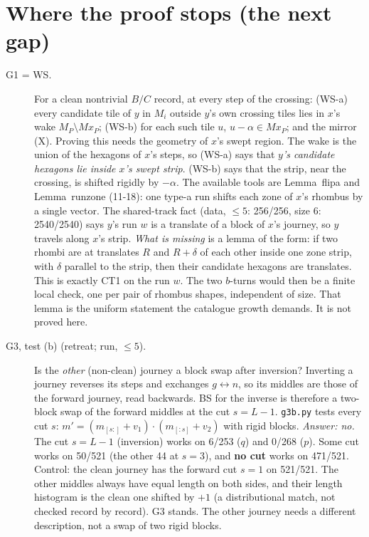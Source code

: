 \documentclass[11pt]{article}
\theoremstyle{definition}\newtheorem{definition}[theorem]{Definition}\newtheorem{remark}[theorem]{Remark}
\begin{document}
\section{Where the proof stops (the next gap)}\label{sec:gap}
\begin{description}
\item[G1 = WS.] For a clean nontrivial $B/C$ record, at every step of the crossing: (WS-a) every candidate tile of $y$ in $M_i$ outside $y$'s own crossing tiles lies in $x$'s wake $M_P\setminus Mx_P$; (WS-b) for each such tile $u$, $u-\alpha\in Mx_P$; and the mirror (X).
Proving this needs the geometry of $x$'s swept region. The wake is the union of the hexagons of $x$'s steps, so (WS-a) says that \emph{$y$'s candidate hexagons lie inside $x$'s swept strip}. (WS-b) says that the strip, near the crossing, is shifted rigidly by $-\alpha$.
The available tools are Lemma~flipa and Lemma~runzone (11-18): one type-a run shifts each zone of $x$'s rhombus by a single vector. The shared-track fact (data, $\le5$: 256/256, size 6: 2540/2540) says $y$'s run $w$ is a translate of a block of $x$'s journey, so $y$ travels along $x$'s strip.
\emph{What is missing} is a lemma of the form: if two rhombi are at translates $R$ and $R+\delta$ of each other inside one zone strip, with $\delta$ parallel to the strip, then their candidate hexagons are translates. This is exactly CT1 on the run $w$. The two $b$-turns would then be a finite local check, one per pair of rhombus shapes, independent of size.
That lemma is the uniform statement the catalogue growth demands. It is not proved here.
\item[G3, test (b) (retreat; run, $\le5$).] Is the \emph{other} (non-clean) journey a block swap after inversion? Inverting a journey reverses its steps and exchanges $g\leftrightarrow n$, so its middles are those of the forward journey, read backwards.
BS for the inverse is therefore a two-block swap of the forward middles at the cut $s=L-1$. \texttt{g3b.py} tests every cut $s$: $m'=(m_{[s:]}+v_1)\cdot(m_{[:s]}+v_2)$ with rigid blocks.
\emph{Answer: no.} The cut $s=L-1$ (inversion) works on 6/253 ($q$) and 0/268 ($p$). Some cut works on 50/521 (the other 44 at $s=3$), and \textbf{no cut} works on 471/521. Control: the clean journey has the forward cut $s=1$ on 521/521.
The other middles always have equal length on both sides, and their length histogram is the clean one shifted by $+1$ (a distributional match, not checked record by record). G3 stands. The other journey needs a different description, not a swap of two rigid blocks.
\end{description}
\end{document}

